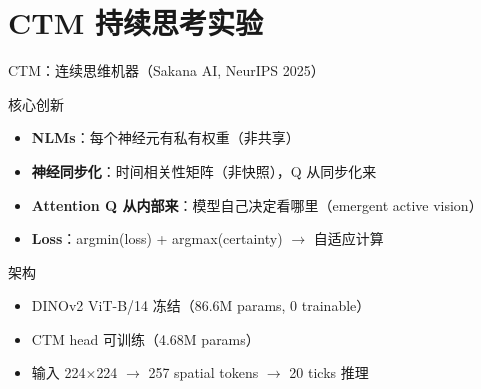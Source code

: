 \documentclass[aspectratio=169, 10pt]{beamer}
\begin{document}
\section{CTM 持续思考实验}

\begin{frame}{CTM：连续思维机器（Sakana AI, NeurIPS 2025）}
  \begin{block}{核心创新}
    \begin{itemize}
      \item \textbf{NLMs}：每个神经元有私有权重（非共享）
      \item \textbf{神经同步化}：时间相关性矩阵（非快照），Q 从同步化来
      \item \textbf{Attention Q 从内部来}：模型自己决定看哪里（emergent active vision）
      \item \textbf{Loss}：argmin(loss) + argmax(certainty) $\to$ 自适应计算
    \end{itemize}
  \end{block}
  \vspace{0em}
  \begin{block}{架构}
    \begin{itemize}
      \item DINOv2 ViT-B/14 冻结（86.6M params, 0 trainable）
      \item CTM head 可训练（4.68M params）
      \item 输入 224$\times$224 $\to$ 257 spatial tokens $\to$ 20 ticks 推理
    \end{itemize}
  \end{block}
\end{frame}
\end{document}
